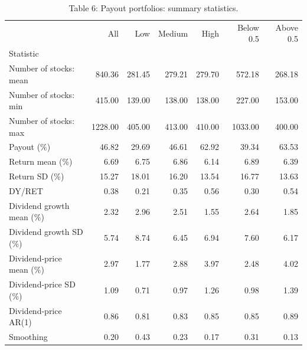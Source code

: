 \begin{table}
\caption{Table 6: Payout portfolios: summary statistics.}
\label{tab:replication_6}
\begin{tabular}{lrrrrrr}
\toprule
 & All & Low & Medium & High & Below 0.5 & Above 0.5 \\
Statistic &  &  &  &  &  &  \\
\midrule
Number of stocks: mean & 840.36 & 281.45 & 279.21 & 279.70 & 572.18 & 268.18 \\
Number of stocks: min & 415.00 & 139.00 & 138.00 & 138.00 & 227.00 & 153.00 \\
Number of stocks: max & 1228.00 & 405.00 & 413.00 & 410.00 & 1033.00 & 400.00 \\
Payout (\%) & 46.82 & 29.69 & 46.61 & 62.92 & 39.34 & 63.53 \\
Return mean (\%) & 6.69 & 6.75 & 6.86 & 6.14 & 6.89 & 6.39 \\
Return SD (\%) & 15.27 & 18.01 & 16.20 & 13.54 & 16.77 & 13.63 \\
DY/RET & 0.38 & 0.21 & 0.35 & 0.56 & 0.30 & 0.54 \\
Dividend growth mean (\%) & 2.32 & 2.96 & 2.51 & 1.55 & 2.64 & 1.85 \\
Dividend growth SD (\%) & 5.74 & 8.74 & 6.45 & 6.94 & 7.60 & 6.17 \\
Dividend-price mean (\%) & 2.97 & 1.77 & 2.88 & 3.97 & 2.48 & 4.02 \\
Dividend-price SD (\%) & 1.09 & 0.71 & 0.97 & 1.26 & 0.98 & 1.39 \\
Dividend-price AR(1) & 0.86 & 0.81 & 0.83 & 0.85 & 0.85 & 0.89 \\
Smoothing & 0.20 & 0.43 & 0.23 & 0.17 & 0.31 & 0.13 \\
\bottomrule
\end{tabular}
\end{table}
